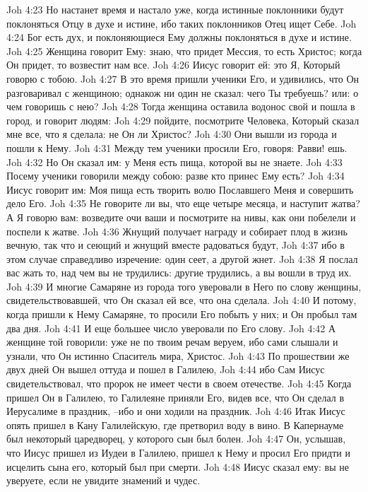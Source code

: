 Joh 4:23  Но настанет время и настало уже, когда истинные поклонники будут поклоняться Отцу в духе и истине, ибо таких поклонников Отец ищет Себе.
Joh 4:24  Бог есть дух, и поклоняющиеся Ему должны поклоняться в духе и истине.
Joh 4:25  Женщина говорит Ему: знаю, что придет Мессия, то есть Христос; когда Он придет, то возвестит нам все.
Joh 4:26  Иисус говорит ей: это Я, Который говорю с тобою.
Joh 4:27  В это время пришли ученики Его, и удивились, что Он разговаривал с женщиною; однакож ни один не сказал: чего Ты требуешь? или: о чем говоришь с нею?
Joh 4:28  Тогда женщина оставила водонос свой и пошла в город, и говорит людям:
Joh 4:29  пойдите, посмотрите Человека, Который сказал мне все, что я сделала: не Он ли Христос?
Joh 4:30  Они вышли из города и пошли к Нему.
Joh 4:31  Между тем ученики просили Его, говоря: Равви! ешь.
Joh 4:32  Но Он сказал им: у Меня есть пища, которой вы не знаете.
Joh 4:33  Посему ученики говорили между собою: разве кто принес Ему есть?
Joh 4:34  Иисус говорит им: Моя пища есть творить волю Пославшего Меня и совершить дело Его.
Joh 4:35  Не говорите ли вы, что еще четыре месяца, и наступит жатва? А Я говорю вам: возведите очи ваши и посмотрите на нивы, как они побелели и поспели к жатве.
Joh 4:36  Жнущий получает награду и собирает плод в жизнь вечную, так что и сеющий и жнущий вместе радоваться будут,
Joh 4:37  ибо в этом случае справедливо изречение: один сеет, а другой жнет.
Joh 4:38  Я послал вас жать то, над чем вы не трудились: другие трудились, а вы вошли в труд их.
Joh 4:39  И многие Самаряне из города того уверовали в Него по слову женщины, свидетельствовавшей, что Он сказал ей все, что она сделала.
Joh 4:40  И потому, когда пришли к Нему Самаряне, то просили Его побыть у них; и Он пробыл там два дня.
Joh 4:41  И еще большее число уверовали по Его слову.
Joh 4:42  А женщине той говорили: уже не по твоим речам веруем, ибо сами слышали и узнали, что Он истинно Спаситель мира, Христос.
Joh 4:43  По прошествии же двух дней Он вышел оттуда и пошел в Галилею,
Joh 4:44  ибо Сам Иисус свидетельствовал, что пророк не имеет чести в своем отечестве.
Joh 4:45  Когда пришел Он в Галилею, то Галилеяне приняли Его, видев все, что Он сделал в Иерусалиме в праздник, --ибо и они ходили на праздник.
Joh 4:46  Итак Иисус опять пришел в Кану Галилейскую, где претворил воду в вино. В Капернауме был некоторый царедворец, у которого сын был болен.
Joh 4:47  Он, услышав, что Иисус пришел из Иудеи в Галилею, пришел к Нему и просил Его придти и исцелить сына его, который был при смерти.
Joh 4:48  Иисус сказал ему: вы не уверуете, если не увидите знамений и чудес.
